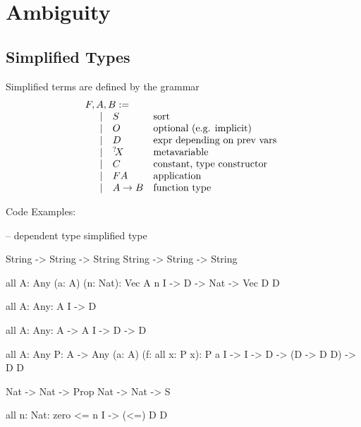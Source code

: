 \section{Ambiguity}




\subsection{Simplified Types}

Simplified terms are defined by the grammar
$$
\begin{array}{lllll} 
    F, A, B :=
    \\
    \quad
    \begin{array}{lllll} 
        \mid&
        S &\text{sort}
        \\
        \mid&
        O &\text{optional (e.g. implicit)}
        \\
        \mid&
        D &\text{expr depending on prev vars}
        \\
        \mid&
        {{}^? \kern-0.2em X} &\text{metavariable}
        \\
        \mid&
        C &\text{constant, type constructor}
        \\
        \mid&
        F A &\text{application}
        \\
        \mid&
        A \to B &\text{function type}
     \end{array}
 \end{array}
$$


Code Examples:
\begin{alba}
    -- dependent type                               simplified type
 
    String -> String -> String                      String -> String -> String

    all {A: Any} (a: A) (n: Nat): Vec A n           I -> D -> Nat -> Vec D D

    all {A: Any}: A                                 I -> D

    all {A: Any}: A -> A                            I -> D -> D

    all {A: Any} {P: A -> Any} (a: A) (f: all x: P x): P a
                                                    I -> I -> D -> (D -> D D) -> D D

    Nat -> Nat -> Prop                              Nat -> Nat -> S

    all {n: Nat}: zero <= n                         I -> (<=) D D
\end{alba}

